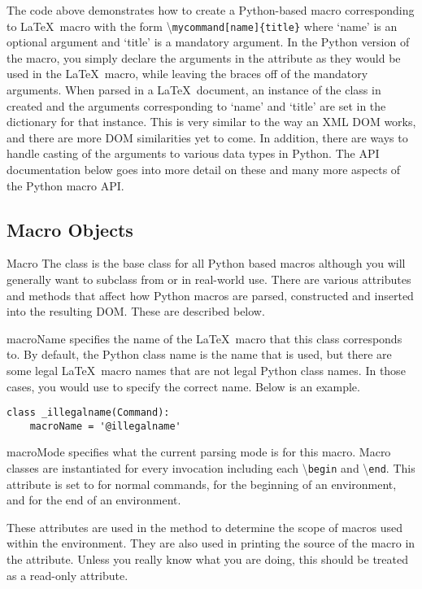 \documentclass{manual}
\newcommand{\macro}[1]{\textbackslash\texttt{#1}}
\begin{document}
The code above demonstrates how to create a Python-based macro corresponding
to \LaTeX\ macro with the form \macro{mycommand[name]\{title\}} where `name'
is an optional argument and `title' is a mandatory argument.  In the Python
version of the macro, you simply declare the arguments in the 
attribute as they would be used in the \LaTeX\ macro, while leaving the braces
off of the mandatory arguments.  When parsed in a \LaTeX\ document, an instance
of the class  in created and the arguments corresponding to
`name' and `title' are set in the  dictionary for that 
instance.  This is very similar to the way an XML DOM works, and there are
more DOM similarities yet to come.  In addition, there are ways to handle
casting of the arguments to various data types in Python.  The API documentation
below goes into more detail on these and many more aspects of the Python
macro API.

\subsection{Macro Objects}

\begin{classdesc}{Macro}{}
The  class is the base class for all Python based macros
although you will generally want to subclass from  or 
 in real-world use.  There are various attributes and
methods that affect how Python macros are parsed, constructed and 
inserted into the resulting DOM.  These are described below.
\end{classdesc}

\begin{memberdesc}[Macro]{macroName}
specifies the name of the \LaTeX\ macro that this class corresponds to.  
By default, the Python class name is the name that is used, but there are
some legal \LaTeX\ macro names that are not legal Python class names.
In those cases, you would use  to specify the correct
name.  Below is an example.
\begin{verbatim}
class _illegalname(Command):
    macroName = '@illegalname'
\end{verbatim}
\end{memberdesc}

\begin{memberdesc}[Macro]{macroMode}
specifies what the current parsing mode is for this macro.  Macro classes
are instantiated for every invocation including each \macro{begin} and 
\macro{end}.  This attribute is set to  for normal
commands,  for the beginning of an environment,
and  for the end of an environment.  

These attributes are used in the  method to determine the
scope of macros used within the environment.  They are also used in printing
the source of the macro in the  attribute.  Unless you 
really know what you are doing, this should be treated as a read-only attribute.
\end{memberdesc}
\end{document}
